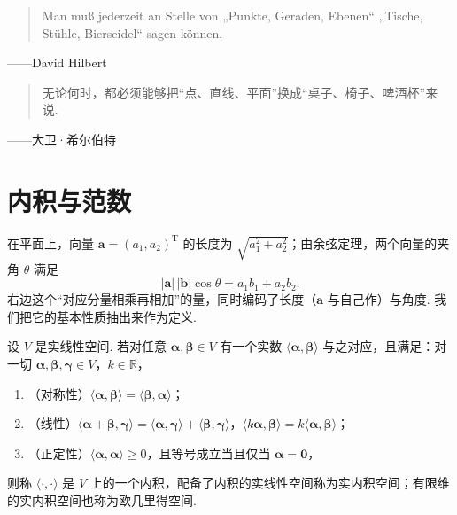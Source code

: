 \documentclass[lang=cn,10.5pt,scheme=chinese,toc=twocol,section,chinesefont=nofont,
twoside,citestyle=gb7714-2015,bibstyle=gb7714-2015]{elegantbook}
\DeclareRobustCommand{\textbf}[1]{{\lnsemiboldlatin\lnsemiboldcjk #1}}
\newcommand{\vv}[1]{\boldsymbol{#1}}
\newcommand{\zero}{\boldsymbol{0}}          %
\newcommand{\trans}{\mathrm{T}}             %
\numberwithin{equation}{section}   %
\begin{document}
\newpage
\begin{tcolorbox}[epigraph, epigraph image*={0.3\linewidth}{image/hilbert.jpg}{大卫·希尔伯特}{fig:hilbert}]
  \begin{quote}
    Man muß jederzeit an Stelle von „Punkte, Geraden, Ebenen“ „Tische, Stühle, Bierseidel“ sagen können.
  \end{quote}
  \begin{flushright}
    ——David Hilbert
  \end{flushright}
  \begin{quote}
    无论何时，都必须能够把“点、直线、平面”换成“桌子、椅子、啤酒杯”来说.
  \end{quote}
  \begin{flushright}
    ——大卫·希尔伯特\footnotemark
  \end{flushright}
\end{tcolorbox}
\section{内积与范数}\label{sec:innerproduct}

在平面上，向量 $\vv a=(a_1,a_2)^\trans$ 的长度为 $\sqrt{a_1^2+a_2^2}$；由余弦定理，两个向量的夹角 $\theta$ 满足
\[|\vv a|\,|\vv b|\cos\theta=a_1b_1+a_2b_2.\]
右边这个“对应分量相乘再相加”的量，同时编码了长度（$\vv a$ 与自己作）与角度. 我们把它的基本性质抽出来作为定义.

\begin{definition}
  \label{def:innerproduct}
  设 $V$ 是实线性空间. 若对任意 $\vv\alpha,\vv\beta\in V$ 有一个实数 $\langle\vv\alpha,\vv\beta\rangle$ 与之对应，且满足：对一切 $\vv\alpha,\vv\beta,\vv\gamma\in V$，$k\in\mathbb{R}$，
  \begin{enumerate}
    \item （对称性）$\langle\vv\alpha,\vv\beta\rangle=\langle\vv\beta,\vv\alpha\rangle$；
    \item （线性）$\langle\vv\alpha+\vv\beta,\vv\gamma\rangle=\langle\vv\alpha,\vv\gamma\rangle+\langle\vv\beta,\vv\gamma\rangle$，$\langle k\vv\alpha,\vv\beta\rangle=k\langle\vv\alpha,\vv\beta\rangle$；
    \item （正定性）$\langle\vv\alpha,\vv\alpha\rangle\ge0$，且等号成立当且仅当 $\vv\alpha=\zero$，
  \end{enumerate}
  则称 $\langle\cdot,\cdot\rangle$ 是 $V$ 上的一个\textbf{内积}，配备了内积的实线性空间称为\textbf{实内积空间}；有限维的实内积空间也称为\textbf{欧几里得空间}.
\end{definition}
\end{document}

